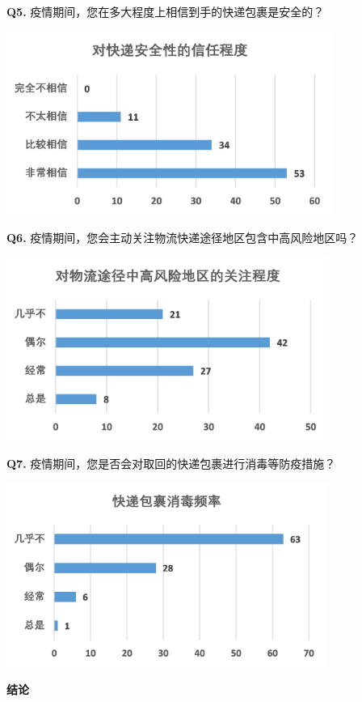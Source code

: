 \documentclass[12pt]{article}
\begin{document}
\noindent \textbf{Q5.} 疫情期间，您在多大程度上相信到手的快递包裹是安全的？
\begin{center}
	\includegraphics[height=6cm]{survey5.png}
\end{center}

\noindent \textbf{Q6.} 疫情期间，您会主动关注物流快递途径地区包含中高风险地区吗？
\begin{center}
	\includegraphics[height=6cm]{survey6.png}
\end{center}

\noindent \textbf{Q7.} 疫情期间，您是否会对取回的快递包裹进行消毒等防疫措施？
\begin{center}
	\includegraphics[height=6cm]{survey7.png}
\end{center}

\noindent \textbf{结论}
\end{document}
